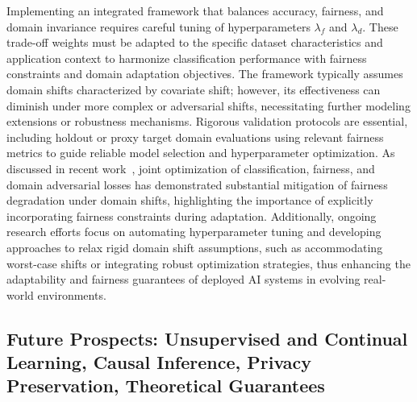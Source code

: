 \documentclass[sigconf]{acmart}
\begin{document}
Implementing an integrated framework that balances accuracy, fairness, and domain invariance requires careful tuning of hyperparameters \(\lambda_f\) and \(\lambda_d\). These trade-off weights must be adapted to the specific dataset characteristics and application context to harmonize classification performance with fairness constraints and domain adaptation objectives. The framework typically assumes domain shifts characterized by covariate shift; however, its effectiveness can diminish under more complex or adversarial shifts, necessitating further modeling extensions or robustness mechanisms. Rigorous validation protocols are essential, including holdout or proxy target domain evaluations using relevant fairness metrics to guide reliable model selection and hyperparameter optimization. As discussed in recent work~\cite{ref26}, joint optimization of classification, fairness, and domain adversarial losses has demonstrated substantial mitigation of fairness degradation under domain shifts, highlighting the importance of explicitly incorporating fairness constraints during adaptation. Additionally, ongoing research efforts focus on automating hyperparameter tuning and developing approaches to relax rigid domain shift assumptions, such as accommodating worst-case shifts or integrating robust optimization strategies, thus enhancing the adaptability and fairness guarantees of deployed AI systems in evolving real-world environments.

\subsection{Future Prospects: Unsupervised and Continual Learning, Causal Inference, Privacy Preservation, Theoretical Guarantees}
\end{document}
